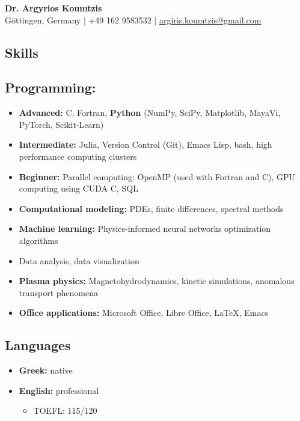 \documentclass[11pt,a4paper]{article}
\begin{document}
	
	\begin{center}
		{\Huge\bfseries Dr. Argyrios Koumtzis}\\[8pt]
		Göttingen, Germany | +49 162 9583532 | \href{mailto:argiris.koumtzis@gmail.com}{argiris.koumtzis@gmail.com}
	\end{center}
	
	\vspace{10pt}
	
	\begin{multicols}{2}
		
		\section{Skills}
		
		\subsection{Programming:}
		\begin{itemize}
			\item \textbf{Advanced:} C, Fortran, \textbf{Python} (NumPy, SciPy, Matplotlib, MayaVi, PyTorch, Scikit-Learn)
			\item \textbf{Intermediate:} Julia, Version Control (Git), Emacs Lisp, bash, high performance computing clusters
			\item \textbf{Beginner:} Parallel computing: OpenMP (used with Fortran and C), GPU computing using CUDA C, SQL
			\item \textbf{Computational modeling:} PDEs, finite differences, spectral methods
			\item \textbf{Machine learning:} Physics-informed neural networks optimization algorithms
			\item Data analysis, data visualization
			\item \textbf{Plasma physics:} Magnetohydrodynamics, kinetic simulations, anomalous transport phenomena
			\item \textbf{Office applications:} Microsoft Office, Libre Office, LaTeX, Emacs
		\end{itemize}
		
		\subsection{Languages}
		\begin{itemize}
			\item \textbf{Greek:} native
			\item \textbf{English:} professional
			\begin{itemize}
				\item TOEFL: 115/120
			\end{itemize}
		\end{itemize}
		

\end{multicols}
\end{document}
